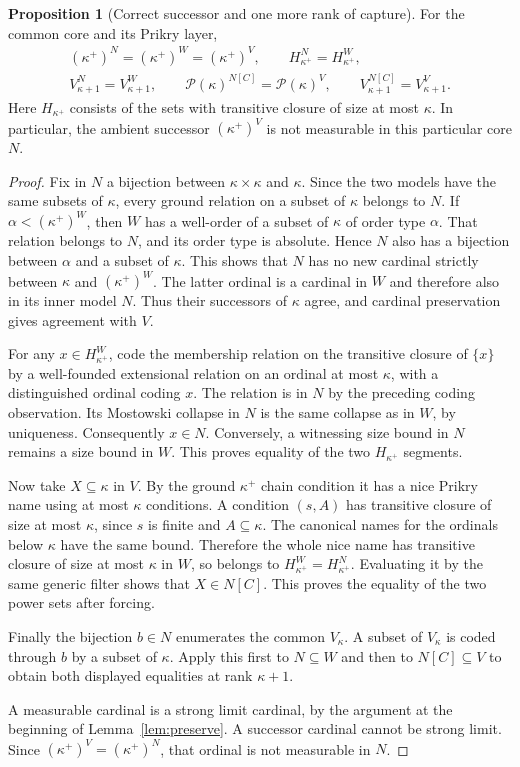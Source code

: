 \documentclass[11pt,letterpaper]{article}
\theoremstyle{definition}
\newtheorem{proposition}[definition]{Proposition}
\numberwithin{equation}{section}
\newcommand{\Pow}{\mathcal P}
\begin{document}
\begin{proposition}[Correct successor and one more rank of capture]\label{prop:rankcapture}
For the common core and its Prikry layer,
\begin{gather*}
 (\kappa^+)^N=(\kappa^+)^W=(\kappa^+)^V,\qquad
 H_{\kappa^+}^N=H_{\kappa^+}^W,\\
 V_{\kappa+1}^N=V_{\kappa+1}^W,\qquad
 \Pow(\kappa)^{N[C]}=\Pow(\kappa)^V,\qquad
 V_{\kappa+1}^{N[C]}=V_{\kappa+1}^V.
\end{gather*}
Here $H_{\kappa^+}$ consists of the sets with transitive closure of size at most $\kappa$. In particular, the ambient successor $(\kappa^+)^V$ is not measurable in this particular core $N$.
\end{proposition}
\begin{proof}
Fix in $N$ a bijection between $\kappa\times\kappa$ and $\kappa$. Since the two models have the same subsets of $\kappa$, every ground relation on a subset of $\kappa$ belongs to $N$. If $\alpha<(\kappa^+)^W$, then $W$ has a well-order of a subset of $\kappa$ of order type $\alpha$. That relation belongs to $N$, and its order type is absolute. Hence $N$ also has a bijection between $\alpha$ and a subset of $\kappa$. This shows that $N$ has no new cardinal strictly between $\kappa$ and $(\kappa^+)^W$. The latter ordinal is a cardinal in $W$ and therefore also in its inner model $N$. Thus their successors of $\kappa$ agree, and cardinal preservation gives agreement with $V$.

For any $x\in H_{\kappa^+}^W$, code the membership relation on the transitive closure of $\{x\}$ by a well-founded extensional relation on an ordinal at most $\kappa$, with a distinguished ordinal coding $x$. The relation is in $N$ by the preceding coding observation. Its Mostowski collapse in $N$ is the same collapse as in $W$, by uniqueness. Consequently $x\in N$. Conversely, a witnessing size bound in $N$ remains a size bound in $W$. This proves equality of the two $H_{\kappa^+}$ segments.

Now take $X\subseteq\kappa$ in $V$. By the ground $\kappa^+$ chain condition it has a nice Prikry name using at most $\kappa$ conditions. A condition $(s,A)$ has transitive closure of size at most $\kappa$, since $s$ is finite and $A\subseteq\kappa$. The canonical names for the ordinals below $\kappa$ have the same bound. Therefore the whole nice name has transitive closure of size at most $\kappa$ in $W$, so belongs to $H_{\kappa^+}^W=H_{\kappa^+}^N$. Evaluating it by the same generic filter shows that $X\in N[C]$. This proves the equality of the two power sets after forcing.

Finally the bijection $b\in N$ enumerates the common $V_\kappa$. A subset of $V_\kappa$ is coded through $b$ by a subset of $\kappa$. Apply this first to $N\subseteq W$ and then to $N[C]\subseteq V$ to obtain both displayed equalities at rank $\kappa+1$.

A measurable cardinal is a strong limit cardinal, by the argument at the beginning of Lemma~\ref{lem:preserve}. A successor cardinal cannot be strong limit. Since $(\kappa^+)^V=(\kappa^+)^N$, that ordinal is not measurable in $N$.
\end{proof}
\end{document}
